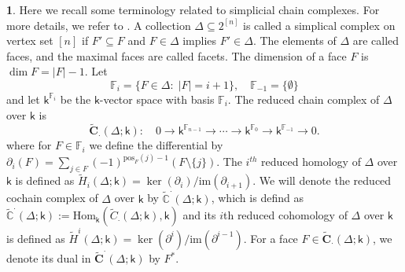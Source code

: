 \documentclass[10pt,reqno]{amsart}
\theoremstyle{definition}
\newtheorem{definition}[subsection]{Definition}
\newtheorem{chunk}[subsection]{}
\theoremstyle{remark}
\numberwithin{equation}{section}
\newcommand{\kk}{\mathsf k}
\numberwithin{equation}{section}
\begin{document}
\begin{chunk}
     Here we recall some terminology related to simplicial chain complexes. For more details, we refer to \cite[Chapter 1]{miller2005combinatorial}. A collection $\Delta\subseteq 2^{[n]}$ is called a simplical complex on vertex set $[n]$ if $F'\subseteq F$ and $F \in \Delta$ implies $F'\in \Delta$. The elements of $\Delta$ are called faces, and the maximal faces are called facets. The dimension of a face $F$ is $\dim F=|F|-1$. 
      Let \[
    \mathbb{F}_i=\{F\in \Delta:\;|F|=i+1\},\quad \mathbb{F}_{-1}=\{\emptyset\} \]
    and let $\kk^{\mathbb{F}_i}$ be the $\kk$-vector space with basis $\mathbb{F}_i$. The reduced chain complex of $\Delta$ over $\kk$ is \[
        \widetilde{\mathbf{C}}_{\cdot}(\Delta;\kk):\quad
0 \longrightarrow \mathbf{\kk}^{\mathbb{F}_{n-1}}
\xrightarrow{}
\cdots
\xrightarrow{}
\mathbf{\kk}^{\mathbb{F}_{0}}
\xrightarrow{}
\mathbf{\kk}^{\mathbb{F}_{-1}}
\longrightarrow 0.
\]
where for $F\in \mathbb{F}_i$ we define the differential by $
\partial_i(F)=\sum_{j\in F}(-1)^{\mathrm{pos}_{F}(j)-1}(F\setminus \{j\})
$. The $i^{th}$ reduced homology of $\Delta$ over $\kk$ is defined as $
\widetilde{H}_i(\Delta;\kk)=\ker(\partial_i)/\mathrm{im}(\partial_{i+1}).$ We will denote the reduced cochain complex of $\Delta$ over $\kk$ by $\widetilde{\mathbb C}^{\cdot}(\Delta;\kk)$, which is defind as $ \widetilde{\mathbb C}^{\cdot}(\Delta;\kk)
:=\mathrm{Hom}_{\kk}(\widetilde{{C}}_{\cdot}(\Delta;\kk),\kk)$ and its $i$th reduced cohomology of $\Delta$ over $\kk$ is defined as $\widetilde{H}^{i}(\Delta;\kk)=\ker(\partial^{i})/\mathrm{im}(\partial^{i-1})$. For a face $F\in \widetilde{\mathbf{C}}_{\cdot}(\Delta;\kk)$, we denote its dual in $ \widetilde{\mathbf{C}}^{\cdot}(\Delta;\kk)$ by $F^*$. 
     

\end{chunk}
\end{document}
